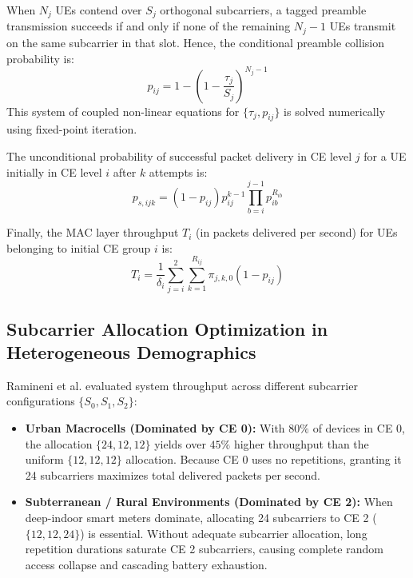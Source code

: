 When $N_j$ UEs contend over $S_j$ orthogonal subcarriers, a tagged preamble transmission succeeds if and only if none of the remaining $N_j - 1$ UEs transmit on the same subcarrier in that slot. Hence, the conditional preamble collision probability is:
\begin{equation}
    p_{ij} = 1 - \left( 1 - \frac{\tau_j}{S_j} \right)^{N_j - 1}
\end{equation}
This system of coupled non-linear equations for $\{\tau_j, p_{ij}\}$ is solved numerically using fixed-point iteration.

The unconditional probability of successful packet delivery in CE level $j$ for a UE initially in CE level $i$ after $k$ attempts is:
\begin{equation}
    p_{s,ijk} = (1 - p_{ij}) p_{ij}^{k-1} \prod_{b=i}^{j-1} p_{ib}^{R_{ib}}
\end{equation}

Finally, the MAC layer throughput $T_i$ (in packets delivered per second) for UEs belonging to initial CE group $i$ is:
\begin{equation}
    \label{eq:nbiot_throughput}
    T_i = \frac{1}{\delta_i} \sum_{j=i}^2 \sum_{k=1}^{R_{ij}} \pi_{j,k,0} (1 - p_{ij})
\end{equation}

\subsection{Subcarrier Allocation Optimization in Heterogeneous Demographics}
Ramineni et al. \cite{ramineni2022performance} evaluated system throughput across different subcarrier configurations $\{S_0, S_1, S_2\}$:
\begin{itemize}
    \item \textbf{Urban Macrocells (Dominated by CE 0):} With $80\%$ of devices in CE 0, the allocation $\{24, 12, 12\}$ yields over $45\%$ higher throughput than the uniform $\{12, 12, 12\}$ allocation. Because CE 0 uses no repetitions, granting it 24 subcarriers maximizes total delivered packets per second.
    \item \textbf{Subterranean / Rural Environments (Dominated by CE 2):} When deep-indoor smart meters dominate, allocating 24 subcarriers to CE 2 ($\{12, 12, 24\}$) is essential. Without adequate subcarrier allocation, long repetition durations saturate CE 2 subcarriers, causing complete random access collapse and cascading battery exhaustion.
\end{itemize}

